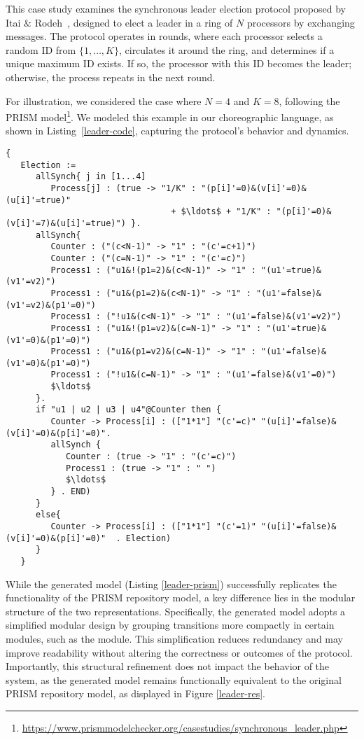 This case study examines the synchronous leader election protocol proposed by Itai $\&$ Rodeh~\cite{IR90}, designed to elect a leader in a ring of $N$ processors by exchanging messages. The protocol operates in rounds, where each processor selects a random ID from $\{1, \ldots, K\}$, circulates it around the ring, and determines if a unique maximum ID exists. If so, the processor with this ID becomes the leader; otherwise, the process repeats in the next round.

For illustration, we considered the case where $ N=4 $ and $ K=8 $, following the PRISM model\footnote{\url{https://www.prismmodelchecker.org/casestudies/synchronous_leader.php}}. We modeled this example in our choreographic language, as shown in Listing~\ref{leader-code}, capturing the protocol's behavior and dynamics.

\begin{lstlisting}[style=chor-color,caption={Choreography for the Synchronous Leader Election Protocol.},captionpos=b,label={leader-code}]
   {
   Election := 
      allSynch{ j in [1...4]
         Process[j] : (true -> "1/K" : "(p[i]'=0)&(v[i]'=0)&(u[i]'=true)" 
                                 + $\ldots$ + "1/K" : "(p[i]'=0)&(v[i]'=7)&(u[i]'=true)") }.
      allSynch{
         Counter : ("(c<N-1)" -> "1" : "(c'=c+1)")
         Counter : ("(c=N-1)" -> "1" : "(c'=c)")
         Process1 : ("u1&!(p1=2)&(c<N-1)" -> "1" : "(u1'=true)&(v1'=v2)")
         Process1 : ("u1&(p1=2)&(c<N-1)" -> "1" : "(u1'=false)&(v1'=v2)&(p1'=0)")
         Process1 : ("!u1&(c<N-1)" -> "1" : "(u1'=false)&(v1'=v2)")
         Process1 : ("u1&!(p1=v2)&(c=N-1)" -> "1" : "(u1'=true)&(v1'=0)&(p1'=0)")
         Process1 : ("u1&(p1=v2)&(c=N-1)" -> "1" : "(u1'=false)&(v1'=0)&(p1'=0)")
         Process1 : ("!u1&(c=N-1)" -> "1" : "(u1'=false)&(v1'=0)")
         $\ldots$
      }.
      if "u1 | u2 | u3 | u4"@Counter then {
         Counter -> Process[i] : (["1*1"] "(c'=c)" "(u[i]'=false)&(v[i]'=0)&(p[i]'=0)". 
         allSynch {
            Counter : (true -> "1" : "(c'=c)")
            Process1 : (true -> "1" : " ")
            $\ldots$               
         } . END)
      }
      else{
         Counter -> Process[i] : (["1*1"] "(c'=1)" "(u[i]'=false)&(v[i]'=0)&(p[i]'=0)"  . Election)
      }      
   }
   \end{lstlisting} 
   While the generated model (Listing \ref{leader-prism}) successfully replicates the functionality of 
   the PRISM repository model, a key difference lies in the modular 
   structure of the two representations. 
   Specifically, the generated model adopts a simplified modular design by 
   grouping transitions more compactly in certain modules, such as the  module. 
   This simplification reduces redundancy and may improve readability without altering the correctness or outcomes of the protocol. Importantly, this structural refinement does not impact the behavior of the system, as the generated model remains functionally equivalent to the original PRISM repository model, as displayed in Figure \ref{leader-res}.

